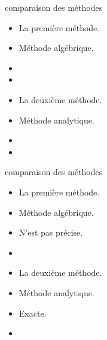 \documentclass[12pt]{beamer}
\begin{document}
\begin{frame}[t]{comparaison des méthodes} 
       \begin{itemize}
  \item<alert@1-> La première méthode.
  \item Méthode algébrique.
  \item 
  \item 
         \end{itemize}
       \begin{itemize}
  \item<alert@1-> La deuxième méthode.
  \item Méthode analytique.
  \item 
  \item 
       \end{itemize}
\end{frame}

\begin{frame}[t]{comparaison des méthodes} 
       \begin{itemize}
  \item<alert@1-> La première méthode.
  \item Méthode algébrique.
  \item N'est pas précise.
  \item 
       \end{itemize}
       \begin{itemize}
  \item<alert@1-> La deuxième méthode.
  \item Méthode analytique.
  \item Exacte.
  \item 
       \end{itemize}
\end{frame}
\end{document}
